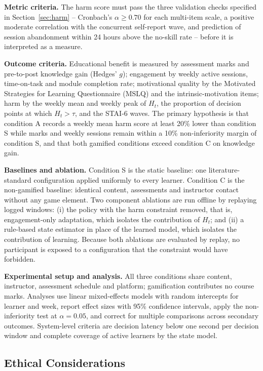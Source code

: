 \documentclass[12pt,a4paper]{article}
\begin{document}
\begin{justify}
\textbf{Metric criteria.} The harm score must pass the three validation checks specified in
Section~\ref{sec:harm} -- Cronbach's $\alpha \ge 0.70$ for each multi-item scale, a positive
moderate correlation with the concurrent self-report wave, and prediction of session abandonment
within 24 hours above the no-skill rate -- before it is interpreted as a measure.

\textbf{Outcome criteria.} Educational benefit is measured by assessment marks and pre-to-post
knowledge gain (Hedges' $g$); engagement by weekly active sessions, time-on-task and module
completion rate; motivational quality by the Motivated Strategies for Learning Questionnaire (MSLQ) and the intrinsic-motivation items; harm by the
weekly mean and weekly peak of $H_t$, the proportion of decision points at which $H_t>\tau$, and the
STAI-6 waves. The primary hypothesis is that condition A records a weekly mean harm score at least
20\% lower than condition S while marks and weekly sessions remain within a 10\% non-inferiority
margin of condition S, and that both gamified conditions exceed condition C on knowledge gain.

\textbf{Baselines and ablation.} Condition S is the static baseline: one literature-standard
configuration applied uniformly to every learner. Condition C is the non-gamified baseline:
identical content, assessments and instructor contact without any game element. Two component
ablations are run offline by replaying logged windows: (i) the policy with the harm constraint
removed, that is, engagement-only adaptation, which isolates the contribution of $H_t$; and (ii) a
rule-based state estimator in place of the learned model, which isolates the contribution of
learning. Because both ablations are evaluated by replay, no participant is exposed to a
configuration that the constraint would have forbidden.

\textbf{Experimental setup and analysis.} All three conditions share content, instructor,
assessment schedule and platform; gamification contributes no course marks. Analyses use linear
mixed-effects models with random intercepts for learner and week, report effect sizes with 95\%
confidence intervals, apply the non-inferiority test at $\alpha = 0.05$, and correct for multiple
comparisons across secondary outcomes. System-level criteria are decision latency below one second
per decision window and complete coverage of active learners by the state model.

\subsection{Ethical Considerations}
\label{sec:ethics}


\end{justify}
\end{document}
